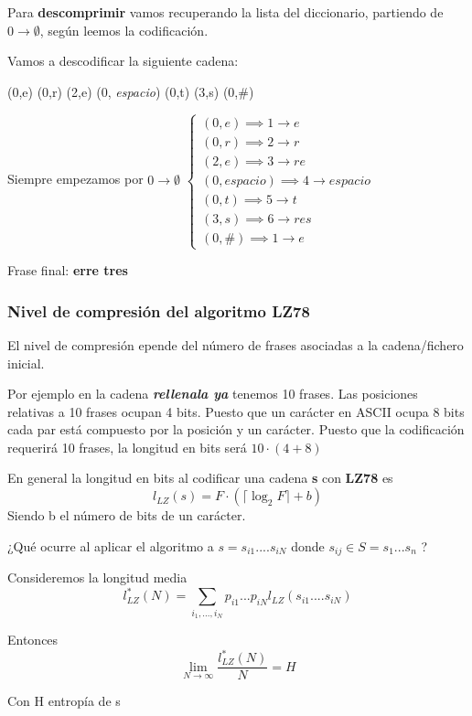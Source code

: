 Para \textbf{descomprimir} vamos recuperando la lista del diccionario, partiendo de $0 \rightarrow \emptyset$, según leemos la codificación.

\begin{example}
Vamos a descodificar la siguiente cadena:

(0,e) (0,r) (2,e) (0, \textit{espacio}) (0,t) (3,s) (0,\#)

Siempre empezamos por $0 \rightarrow \emptyset$
$\begin{cases}
 (0,e) \implies 1 \rightarrow e\\
  (0,r) \implies 2 \rightarrow r\\
  (2,e) \implies 3 \rightarrow re\\
   (0, \textit{espacio}) \implies 4 \rightarrow \textit{espacio}\\
   (0,t) \implies 5 \rightarrow t\\
    (3,s) \implies 6 \rightarrow res\\
     (0,\#) \implies 1 \rightarrow e
\end{cases}$

Frase final: \textbf{erre tres}
\end{example}

\subsubsection{Nivel de compresión del algoritmo LZ78}

El nivel de compresión epende del número de frases asociadas a la cadena/fichero inicial.

Por ejemplo en la cadena \textbf{\textit{rellenala ya}} tenemos 10 frases. Las posiciones relativas a 10 frases ocupan 4 bits. Puesto que un carácter en ASCII ocupa 8 bits cada par está compuesto por la posición y un carácter. Puesto que la codificación requerirá 10 frases, la longitud en bits será $10 \cdot (4 +8)$

En general la longitud en bits al codificar una cadena \textbf{s} con \textbf{LZ78} es
$$l_{LZ} (s) = F \cdot ( \lceil\log_2 F\rceil  + b)$$
Siendo b el número de bits de un carácter.


¿Qué ocurre al aplicar el algoritmo a $s = s_{i1}.... s_{iN}$ donde $s_{ij} \in S = {s_1...s_n}$ ?

\begin{theorem}
	Consideremos la longitud media
	$$l^{*}_{LZ}(N) = \sum_{i_1,...,i_N} p_{i1}...p_{iN} l_{LZ}(s_{i1}....s_{iN})$$

	Entonces
	$$\lim_{N\rightarrow \infty} \frac{l^{*}_{LZ}(N)}{N} = H$$

	Con H entropía de s
\end{theorem}

